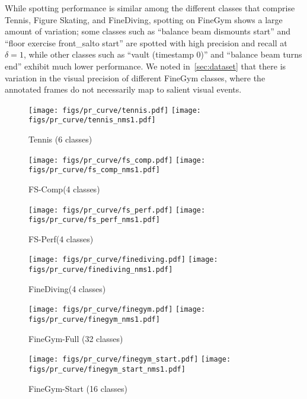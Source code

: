 \documentclass[runningheads]{llncs}
\newcommand{\notation}[1]{\ensuremath{#1}\xspace}
\newcommand{\fscomp}{{FS-Comp}\xspace}
\newcommand{\fsperf}{{FS-Perf}\xspace}
\newcommand{\finegym}{{FineGym}\xspace}
\newcommand{\finediving}{{FineDiving}\xspace}
\newcommand{\Tolerance}{\notation{\delta}}
\begin{document}
While spotting performance is similar among the different classes that comprise Tennis, Figure Skating, and \finediving,
spotting on \finegym shows a large amount of variation; some classes such as
``balance beam dismounts start'' and ``floor exercise front\_salto start''
are spotted with high precision and recall at $\Tolerance=1$, while other classes such as ``vault (timestamp 0)'' and ``balance beam turns end'' exhibit much lower performance.
We noted in~\autoref{sec:dataset} that there is variation in the visual precision of different \finegym classes, where the annotated frames do not necessarily map to salient visual events.

\begin{figure*}[p]
    \centering
    \begin{subfigure}{\textwidth}
        \centering
        \texttt{[image: figs/pr\_curve/tennis.pdf]}
        \texttt{[image: figs/pr\_curve/tennis\_nms1.pdf]}
        \vspace{-1em}
        \caption{Tennis (6 classes)}
    \end{subfigure}
    \begin{subfigure}{\textwidth}
        \centering
        \texttt{[image: figs/pr\_curve/fs\_comp.pdf]}
        \texttt{[image: figs/pr\_curve/fs\_comp\_nms1.pdf]}
        \vspace{-1em}
        \caption{\fscomp (4 classes)}
    \end{subfigure}
    \begin{subfigure}{\textwidth}
        \centering
        \texttt{[image: figs/pr\_curve/fs\_perf.pdf]}
        \texttt{[image: figs/pr\_curve/fs\_perf\_nms1.pdf]}
        \vspace{-1em}
        \caption{\fsperf (4 classes)}
    \end{subfigure}
    \begin{subfigure}{\textwidth}
        \centering
        \texttt{[image: figs/pr\_curve/finediving.pdf]}
        \texttt{[image: figs/pr\_curve/finediving\_nms1.pdf]}
        \vspace{-1em}
        \caption{\finediving (4 classes)}
    \end{subfigure}
    \begin{subfigure}{\textwidth}
        \centering
        \texttt{[image: figs/pr\_curve/finegym.pdf]}
        \texttt{[image: figs/pr\_curve/finegym\_nms1.pdf]}
        \vspace{-1em}
        \caption{\finegym-Full (32 classes)}
    \end{subfigure}
    \begin{subfigure}{\textwidth}
        \centering
        \texttt{[image: figs/pr\_curve/finegym\_start.pdf]}
        \texttt{[image: figs/pr\_curve/finegym\_start\_nms1.pdf]}
        \vspace{-1em}
        \caption{\finegym-Start (16 classes)}
    \end{subfigure}


\end{figure*}
\end{document}
